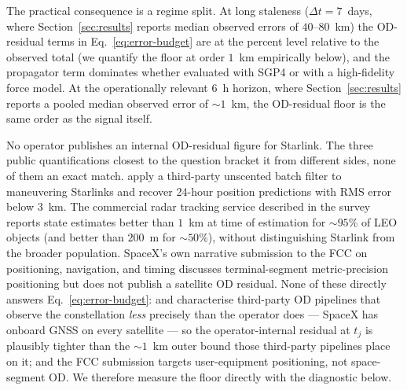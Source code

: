\documentclass[10pt, letterpaper]{article}
\begin{document}
The practical consequence is a regime split. At long staleness
($\Delta t = 7$~days, where Section~\ref{sec:results} reports
median observed errors of $40$--$80$~km) the OD-residual terms in
Eq.~\eqref{eq:error-budget} are at the percent level relative to
the observed total (we quantify the floor at order $1$~km
empirically below), and the propagator term dominates whether
evaluated with SGP4 or with a high-fidelity force model. At the
operationally relevant 6~h horizon, where
Section~\ref{sec:results} reports a pooled median observed error of
$\sim 1$~km, the OD-residual floor is the same order as the signal
itself.

No operator publishes an internal OD-residual figure for Starlink.
The three public quantifications closest to the question bracket
it from different sides, none of them an exact match.
\citet{lang2025} apply a third-party unscented batch filter to
maneuvering Starlinks and recover 24-hour position predictions
with RMS error below $3$~km. The commercial radar tracking service
described in the \citet{leolabs_eoportal} survey reports state
estimates better than $1$~km at time of estimation for
$\sim 95\%$ of LEO objects (and better than $200$~m for
$\sim 50\%$), without distinguishing Starlink from the broader
population. SpaceX's own narrative submission to the FCC on
positioning, navigation, and timing \citep{spacex_fcc_pnt}
discusses terminal-segment metric-precision positioning but does
not publish a satellite OD residual. None of these directly
answers Eq.~\eqref{eq:error-budget}: \citet{lang2025} and
\citet{leolabs_eoportal} characterise third-party OD pipelines
that observe the constellation \emph{less} precisely than the
operator does --- SpaceX has onboard GNSS on every satellite ---
so the operator-internal residual at $t_{j}$ is plausibly tighter
than the $\sim 1$~km outer bound those third-party pipelines
place on it; and the FCC submission targets user-equipment
positioning, not space-segment OD. We therefore measure the floor
directly with the diagnostic below.
\end{document}
